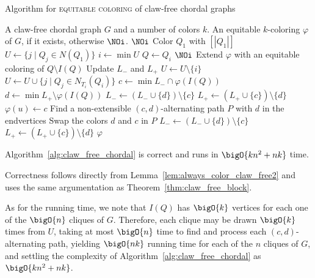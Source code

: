 \begin{algorithm}[!htb]
    \caption{Algorithm for \textsc{equitable coloring} of claw-free chordal graphs}
    \begin{algorithmic}[1]
        \REQUIRE A claw-free chordal graph $G$ and a number of colors $k$.
        \ENSURE An equitable $k$-coloring $\varphi$ of $G$, if it exists, otherwise $\NOi$.
        \smallskip
            \RETURN $\NOi$
        \ENDIF
        \STATE Color $Q_1$ with $[|Q_1|]$
        \STATE $U \gets \{j \mid Q_j \in N(Q_1)\}$
            \STATE $i \gets \min U$
            \STATE $Q \gets Q_i$
                \RETURN $\NOi$
            \ENDIF
                \STATE Extend $\varphi$ with an equitable coloring of $Q \setminus I(Q)$
                \STATE Update $L_-$ and $L_+$
                \STATE $U \gets U \setminus \{i\}$
                \STATE $U \gets U \cup \{j \mid Q_j \in N_{T_i}(Q_i)\}$
            \ENDIF
            \STATE $c \gets \min L_- \cap \varphi(I(Q))$
            \STATE $d \gets \min L_+ \setminus \varphi(I(Q))$
                \STATE $L_- \gets (L_-  \cup \{d\}) \setminus \{c\}$
                \STATE $L_+ \gets (L_+  \cup \{c\}) \setminus \{d\}$
                \STATE $\varphi(u) \gets c$
            \ELSE
                \STATE Find a non-extensible $(c, d)$-alternating path $P$ with $d$ in the endvertices
                \STATE Swap the colors $d$ and $c$ in $P$
                \STATE $L_- \gets (L_-  \cup \{d\}) \setminus \{c\}$
                \STATE $L_+ \gets (L_+  \cup \{c\}) \setminus \{d\}$
            \ENDIF
        \ENDWHILE
        \RETURN $\varphi$
    \end{algorithmic}
\label{alg:claw_free_chordal}
\end{algorithm}

\begin{theorem}
    Algorithm~\ref{alg:claw_free_chordal} is correct and runs in $\bigO{kn^2 + nk}$ time.
\end{theorem}

\begin{tproof}
    Correctness follows directly from Lemma~\ref{lem:always_color_claw_free2} and uses the same argumentation as Theorem~\ref{thm:claw_free_block}.
    
    As for the running time, we note that $I(Q)$ has $\bigO{k}$ vertices for each one of the $\bigO{n}$ cliques of $G$.
    Therefore, each clique may be drawn $\bigO{k}$ times from $U$, taking at most $\bigO{n}$ time to find and process each $(c,d)$-alternating path, yielding $\bigO{nk}$ running time for each of the $n$ cliques of $G$, and settling the complexity of Algorithm~\ref{alg:claw_free_chordal} as $\bigO{kn^2 + nk}$.
\end{tproof}


